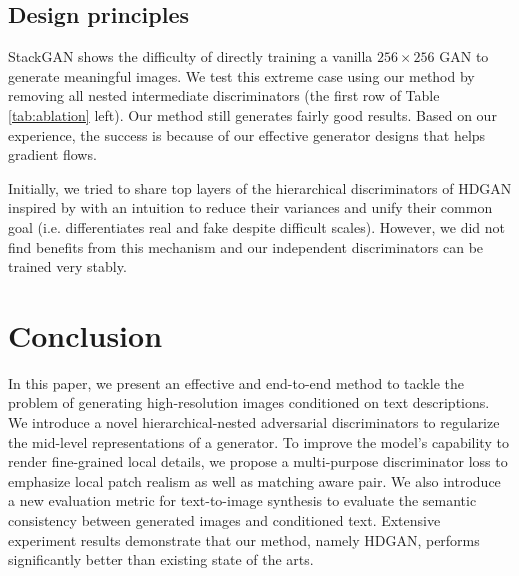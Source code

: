 \documentclass[10pt,twocolumn,letterpaper]{article}
\begin{document}
\subsection{Design principles}
StackGAN shows the difficulty of directly training a vanilla $256{\times}256$ GAN to generate meaningful images. 
We test this extreme case using our method by removing all nested intermediate discriminators (the first row of Table \ref{tab:ablation} left). Our method still generates fairly good results. 
Based on our experience, the success is because of our effective generator designs that helps gradient flows.

Initially, we tried to share top layers of the hierarchical discriminators of HDGAN inspired by \cite{liu2017unsupervised} with an intuition to reduce their variances and unify their common goal (i.e. differentiates real and fake despite difficult scales). However, we did not find benefits from this mechanism and our independent discriminators can be trained very stably. 

%


\section{Conclusion}
In this paper, we present an effective and end-to-end method to tackle the problem of generating high-resolution images conditioned on text descriptions. We introduce a novel hierarchical-nested adversarial discriminators to regularize the mid-level representations of a generator. To improve the model's capability to render fine-grained local details, we propose a multi-purpose discriminator loss to emphasize local patch realism as well as matching aware pair. We also introduce a new evaluation metric for text-to-image synthesis to evaluate the semantic consistency between generated images and conditioned text.
Extensive experiment results demonstrate that our method, namely HDGAN, performs significantly better than existing state of the arts.


{\small


}
\end{document}
